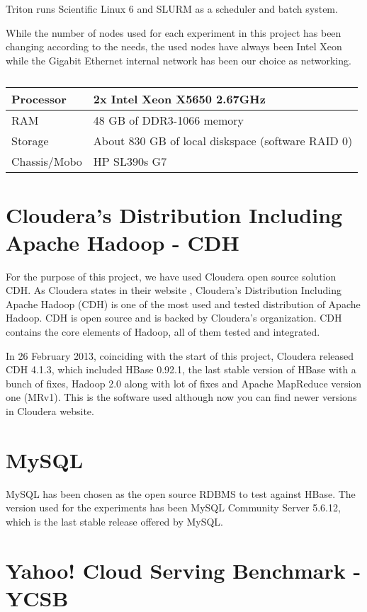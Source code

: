 Triton runs Scientific Linux 6 and SLURM as a scheduler and batch system.

\bigskip
While the number of nodes used for each experiment in this project has been changing according to the needs, the used nodes have always been Intel Xeon while the Gigabit Ethernet internal network has been our choice as networking.

\begin{table}[htbp]
\caption{}
\begin{tabular}{|l|l|}
\hline
Processor &  2x Intel Xeon X5650 2.67GHz \\ \hline
RAM  & 48 GB of DDR3-1066 memory \\ \hline
Storage  & About 830 GB of local diskspace (software RAID 0) \\ \hline
Chassis/Mobo  & HP SL390s G7 \\ \hline
\end{tabular}
\label{}
\end{table}


\section{Cloudera's Distribution Including Apache Hadoop - CDH}
For the purpose of this project, we have used Cloudera \cite{Cloudera} open source solution CDH.
As Cloudera states in their website \cite{ClouderaCDH}, Cloudera's Distribution Including Apache Hadoop (CDH) is one of the most used and tested distribution of Apache Hadoop. CDH is open source and is backed by Cloudera's organization. CDH contains the core elements of Hadoop, all of them tested and integrated.
\par
In 26 February 2013, coinciding with the start of this project, Cloudera released CDH 4.1.3, which included HBase 0.92.1, the last stable version of HBase with a bunch of fixes, Hadoop 2.0 along with lot of fixes and Apache MapReduce version one (MRv1). This is the software used although now you can find newer versions in Cloudera website.

\section{MySQL}

MySQL \cite{MySQL} has been chosen as the open source RDBMS to test against HBase. The version used for the experiments has been MySQL Community Server 5.6.12, which is the last stable release offered by MySQL.

\section{Yahoo! Cloud Serving Benchmark - YCSB}


